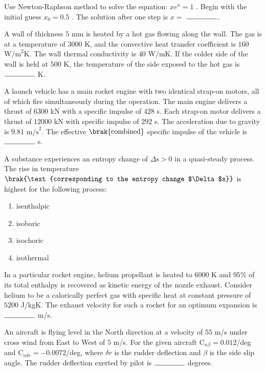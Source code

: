 	\item Use Newton-Raphson method to solve the equation: $xe^{x}=1$ . Begin with the initial guess $x_0=0.5$ . The solution after one step is $x =$ $\rule{1.5cm}{0.4pt}$.\\

	\item A wall of thickness $5$ mm is heated by a hot gas flowing along the wall. The gas is at a temperature of $3000$ K, and the convective heat transfer coefficient is $160$ $\text{W/m}^2$K. The wall thermal conductivity is $40$ W/mK. If the colder side of the wall is held at $500$ K, the temperature of the side exposed to the hot gas is $\rule{1.5cm}{0.4pt}$ K.\\
		
	\item A launch vehicle has a main rocket engine with two identical strap-on motors, all of which fire simultaneously during the operation. The main engine delivers a thrust of $6300$ kN with a specific impulse of $428$ s. Each strap-on motor delivers a thrust of $12000$ kN with specific impulse of $292$ s. The acceleration due to gravity is $9.81$ $\text{m/s}^2$. The effective $\brak{\text{combined}}$ specific impulse of the vehicle is $\rule{1.5cm}{0.4pt}$ s.\\
		
	\item A substance experiences an entropy change of $\Delta \text{s} > 0$ in a quasi-steady process. The rise in temperature $\brak{\text{corresponding to the entropy change $\Delta$s}}$ is highest for the following process:
		\begin{enumerate}
			\item isenthalpic
			\item isobaric
			\item isochoric
			\item isothermal\\
		\end{enumerate}
		
	\item In a particular rocket engine, helium propellant is heated to $6000$ K and $95\%$ of its total enthalpy is recovered as kinetic energy of the nozzle exhaust. Consider helium to be a calorically perfect gas with specific heat at constant pressure of $5200$ J/kgK. The exhaust velocity for such a rocket for an optimum expansion is $\rule{1.5cm}{0.4pt}$ m/s.\\
		
	\item An aircraft is flying level in the North direction at a velocity of $55$ m/s under cross wind from East to West of $5$ m/s. For the given aircraft $\text{C}_{n\beta} = 0.012/$deg and $\text{C}_{n\delta r} = -0.0072/$deg, where $\delta r$ is the rudder deflection and $\beta$ is the side slip angle. The rudder deflection exerted by pilot is $\rule{1.5cm}{0.4pt}$ degrees.\\
		
